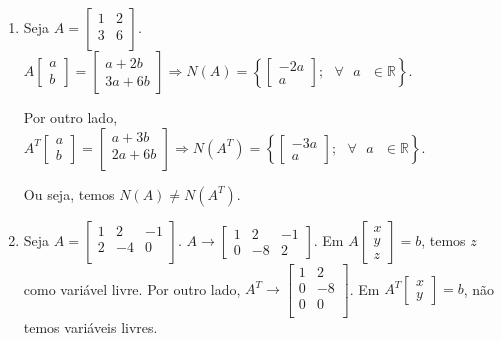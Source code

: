 \documentclass[leqno]{article}
\begin{document}
\begin{enumerate}
    \begin{enumerate}
        \item Seja $A=\begin{bmatrix}
        1 & 2\\
        3 & 6\\
        \end{bmatrix}$. $A\begin{bmatrix}
        a\\
        b
        \end{bmatrix}=\begin{bmatrix}
        a+2b\\
        3a+6b
        \end{bmatrix}\Rightarrow N(A)=\left\{\begin{bmatrix}
        -2a\\
        a
        \end{bmatrix}; \text{ } \forall\text{ }a\text{ }\in\mathbb{R}\right\}$.
        
        Por outro lado, $A^T\begin{bmatrix}
        a\\
        b
        \end{bmatrix}=\begin{bmatrix}
        a+3b\\
        2a+6b\\
        \end{bmatrix}\Rightarrow N(A^T)=\left\{\begin{bmatrix}
        -3a\\
        a
        \end{bmatrix};\text{ }\forall\text{ }a\text{ }\in\mathbb{R}\right\}$.
        
        Ou seja, temos $N(A)\neq N(A^T)$.
        
        \item Seja $A=\begin{bmatrix}
        1 & 2 & -1\\
        2 & -4 & 0\\
        \end{bmatrix}$. $A\rightarrow\begin{bmatrix}
        1 & 2 & -1\\
        0 & -8 & 2
        \end{bmatrix}$. Em $A\begin{bmatrix}
        x\\
        y\\
        z
        \end{bmatrix}=b$, temos $z$ como variável livre. Por outro lado, $A^T\rightarrow\begin{bmatrix}
        1 & 2\\
        0 & -8\\
        0 & 0\\
        \end{bmatrix}$. Em $A^T\begin{bmatrix}
        x\\
        y
        \end{bmatrix}=b$, não temos variáveis livres.
        

\end{enumerate}
\end{enumerate}
\end{document}
